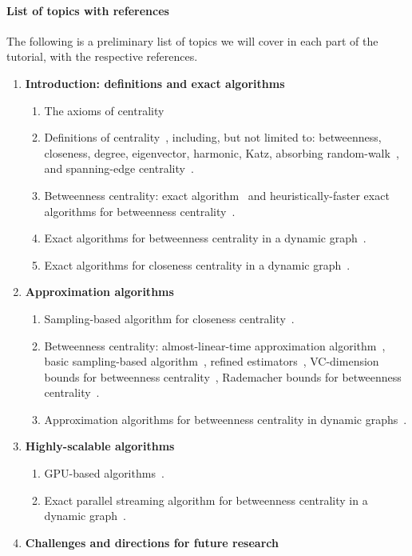 \documentclass[pdfpagelabels=false]{sig-alternate-2013} %
\begin{document}
\paragraph{List of topics with references}
The following is a preliminary list of topics we will cover in each part of the
tutorial, with the respective references.
\begin{enumerate}
	\item {\bf Introduction: definitions and exact algorithms}
		\begin{enumerate}
			\item The axioms of centrality~\citep{BoldiV14}
			\item Definitions of centrality~\citep{Newman10}, including, but not
				limited to: betweenness, closeness, degree, eigenvector,
				harmonic, Katz, absorbing random-walk~\citep{MavroforakisMG15},
				and spanning-edge centrality~\citep{MavroforakisGLKT15}.
			\item Betweenness centrality: exact algorithm~\citep{Brandes01} and
				heuristically-faster exact algorithms for betweenness
				centrality~\citep{ErdosIBT15,SariyuceSKC13}.
			\item Exact algorithms for betweenness centrality in a dynamic
				graph~\citep{LeeLPCC12,NasrePR14,PontecorviR15}.
			\item Exact algorithms for closeness centrality in a dynamic
				graph~\citep{SariyuceKSC13b}.
		\end{enumerate}
	\item {\bf Approximation algorithms}
		\begin{enumerate}
			\item Sampling-based algorithm for closeness
				centrality~\citep{EppsteinW04}.
			\item Betweenness centrality: almost-linear-time approximation
				algorithm~\citep{Yoshida14}, basic sampling-based
				algorithm~\citep{BrandesP07}, refined
				estimators~\citep{GeisbergerSS08}, VC-dimension bounds for
				betweenness centrality~\citep{RiondatoK15}, Rademacher bounds for
        betweenness centrality~\citep{RiondatoU16}.
			\item Approximation algorithms for betweenness centrality in dynamic
				graphs~\citep{KasWCC13,BergaminiMS15,BergaminiM15,HayashiAY15}.
		\end{enumerate}
	\item {\bf Highly-scalable algorithms}
		\begin{enumerate}
			\item GPU-based algorithms~\citep{SariyuceKSC13}.
			\item Exact parallel streaming algorithm for betweenness centrality in a
				dynamic graph~\citep{KourtellisMB15}.
		\end{enumerate}
	\item {\bf Challenges and directions for future research}
\end{enumerate}
\end{document}
